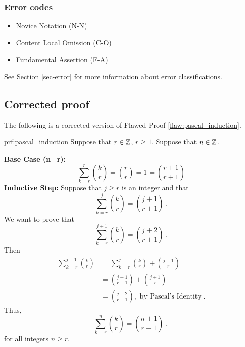  
\subsubsection{Error codes}
\begin{itemize}
	\item   Novice Notation (N-N)
	\item   Content Local Omission (C-O)
	\item   Fundamental Assertion (F-A)
\end{itemize}
See Section \ref{sec-error} for more information about error classifications.

\clearpage
\subsection{Corrected proof}

The following is a corrected version of Flawed Proof \ref{flaw:pascal_induction}.

\begin{prf}{prf:pascal_induction} 
Suppose that $r \in \mathbb Z$, $r\geq 1$.  Suppose that $n \in \mathbb Z$.

\noindent\textbf{Base Case (n=r):} 
$$\sum_{k=r}^{r} \binom{k}{r} = \binom{r}{r} = 1 = \binom{r+1}{r+1}$$ 
\noindent\textbf{Inductive Step:} Suppose that $j \geq r$ is an integer and that 
$$\sum_{k=r}^{j} \binom{k}{r} = \binom{j+1}{r+1}\;.$$
We want to prove that 
$$\sum_{k=r}^{j+1} \binom{k}{r} = \binom{j+2}{r+1}\;.$$
Then 
\begin{align*}
    \sum_{k=r}^{j+1} \binom{k}{r}  &= \sum_{k=r}^{j} \binom{k}{r} + \binom{j+1}{r} \\
    &= \binom{j+1}{r+1} + \binom{j+1}{r}\\
    &= \binom{j+2}{r+1}, \text{ by Pascal's Identity}\;.
\end{align*}
Thus, 
$$\sum_{k=r}^{n} \binom{k}{r} = \binom{n+1}{r+1}\;,$$
for all integers $n \geq r.$
\end{prf}

